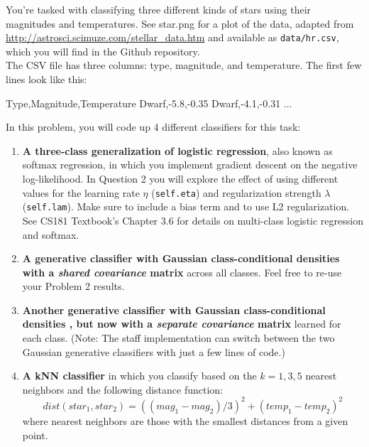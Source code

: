 \documentclass[submit]{harvardml}
\begin{document}

\begin{problem}

You're tasked with classifying three different kinds of stars using their magnitudes and temperatures. See star.png for a plot of
the data, adapted from
\url{http://astrosci.scimuze.com/stellar_data.htm} and available as
\verb|data/hr.csv|, which you will find in the Github repository. \\

The CSV file has three columns: type, magnitude, and temperature. The
first few lines look like this:
\begin{csv}
Type,Magnitude,Temperature
Dwarf,-5.8,-0.35
Dwarf,-4.1,-0.31
...
\end{csv}

In this problem, you will code up 4 different classifiers for this task:
\begin{enumerate}[label=\alph*)]

\item \textbf{A three-class generalization of logistic regression}, also
  known as softmax regression, in which you implement gradient descent on the negative log-likelihood. In Question 2 you will explore the effect of using different values for the learning rate $\eta$ (\texttt{self.eta}) and
  regularization strength $\lambda$ (\texttt{self.lam}).  Make sure to include a bias term and to
  use L2 regularization. See CS181 Textbook's Chapter 3.6 for details on multi-class
  logistic regression and softmax.
  
\item \textbf{A generative classifier with Gaussian class-conditional
  densities with a \textit{shared covariance} matrix} across all classes. 
  Feel free to re-use your Problem 2 results.
\item \textbf{Another generative classifier with Gaussian class-conditional densities , but now 
with a \textit{separate covariance} matrix} learned for each class. (Note: 
The staff implementation can switch between the two Gaussian generative classifiers with just a
few lines of code.)

\item \textbf{A kNN classifier} in which you classify based on the $k=1,3,5$ nearest neighbors and the following distance function: $$dist(star_1, star_2) = ((mag_1 - mag_2)/3)^2 + (temp_1 - temp_2)^2$$
where nearest neighbors are those with the smallest distances from a given point.


\end{enumerate}
\end{problem}
\end{document}

